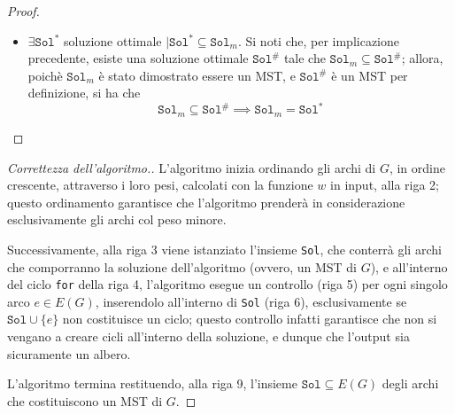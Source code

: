 \documentclass[a4paper, 12pt]{report}
\begin{document}
\begin{proof}
\begin{itemize}
\begin{itemize}
                    \item si noti che, considerando l'insieme di archi $(\texttt{Sol}^* \cup \{e_{k +1}\}) - \{e_j\}$, il vertice $y$ resta coperto
                    \item si noti che l'arco $e_j$ non è in $\texttt{Sol}_{k +1}$, e dunque $k + 1 < j$; allora, per via dell'ordinamento degli archi alla riga $2$, necessariamente $w(e_{k +1}) \le w(e_j)$; dunque, si ha che $$\displaystyle \sum_{e \in ((\texttt{Sol}^* \cup \{e_{k +1}\}) - \{e_j\})}{w(e)} \le \sum_{e \in \texttt{Sol}^*}{w(e)}$$ ma poiché $\texttt{Sol}^*$, per definizione, è soluzione ottimale, non è possibile trovare una soluzione con peso inferiore, e dunque necessariamente $$(\texttt{Sol}^* \cup \{e_{k +1}\}) - \{e_j\}$$ ha lo stesso peso di $\texttt{Sol}^*$, che costituisce un MST di $G$; allora, tale insieme di archi è una soluzione ottimale, contenente $\texttt{Sol}_{k +1}$ per definizione.
                \end{itemize}
            \item[]  $\exists \texttt{Sol}^*$ soluzione ottimale $\mid \texttt{Sol}^* \subseteq \texttt{Sol}_m$. Si noti che, per implicazione precedente, esiste una soluzione ottimale $\texttt{Sol}^\#$ tale che $\texttt{Sol}_m \subseteq \texttt{Sol}^\#$; allora, poichè $\texttt{Sol}_m$ è stato dimostrato essere un MST, e $\texttt{Sol}^\#$ è un MST per definizione, si ha che $$\texttt{Sol}_m \subseteq \texttt{Sol}^\# \implies \texttt{Sol}_m = \texttt{Sol}^*$$
        \end{itemize}
    \end{proof}

    \begin{proof}[Correttezza dell'algoritmo.]
        L'algoritmo inizia ordinando gli archi di $G$, in ordine crescente, attraverso i loro pesi, calcolati con la funzione $w$ in input, alla riga 2; questo ordinamento garantisce che l'algoritmo prenderà in considerazione esclusivamente gli archi col peso minore.

        Successivamente, alla riga 3 viene istanziato l'insieme \texttt{Sol}, che conterrà gli archi che comporranno la soluzione dell'algoritmo (ovvero, un MST di $G$), e all'interno del ciclo \texttt{for} della riga 4, l'algoritmo esegue un controllo (riga 5) per ogni singolo arco $e \in E(G)$, inserendolo all'interno di \texttt{Sol} (riga 6), esclusivamente se $\texttt{Sol} \cup \{e\}$ non costituisce un ciclo; questo controllo infatti garantisce che non si vengano a creare cicli all'interno della soluzione, e dunque che l'output sia sicuramente un albero.

        L'algoritmo termina restituendo, alla riga 9, l'insieme $\texttt{Sol} \subseteq E(G)$ degli archi che costituiscono un MST di $G$.
    \end{proof}
\end{document}
